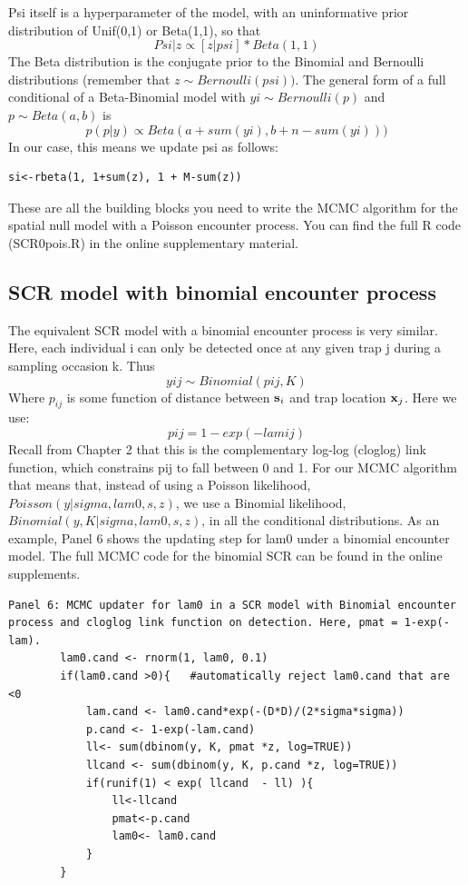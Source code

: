 Psi itself is a hyperparameter of the model, with an uninformative prior distribution of Unif(0,1) or Beta(1,1), so that
\[
Psi|z \propto [z|psi] * Beta(1,1)
\]
The Beta distribution is the conjugate prior to the Binomial and Bernoulli distributions (remember that $z \sim Bernoulli(psi))$. The general form of a full conditional of a Beta-Binomial model with $yi \sim Bernoulli (p) $ and $p \sim Beta(a,b) $ is 
\[
p(p|y) \propto Beta(a + sum(yi), b + n-sum(yi)))
\]
In our case, this means we update psi as follows:
\begin{verbatim}
si<-rbeta(1, 1+sum(z), 1 + M-sum(z)) 
\end{verbatim}

These are all the building blocks you need to write the MCMC algorithm
for the spatial null model with a Poisson encounter process.  You can
find the full R code (SCR0pois.R) in the online supplementary
material.

\subsection{SCR model with binomial encounter process}
The equivalent SCR model with a binomial encounter process is very similar. Here, each individual i can only be detected once at any given trap j during a sampling occasion k. 
Thus
\[
yij \sim Binomial (pij, K)
\]
Where $p_{ij}$ is some function of distance between ${\bf s}_{i}$ and trap location ${\bf x}_{j}$. Here we use:
\[
pij=1-exp(-lamij)
\]
Recall from Chapter 2 that this is the complementary log-log (cloglog) link function, which constrains pij to fall between 0 and 1.
For our MCMC algorithm that means that, instead of using a Poisson likelihood, $Poisson(y|sigma,lam0,s,z)$, we use a Binomial likelihood, $Binomial(y,K|sigma,lam0,s,z)$, in all the conditional distributions. As an example, Panel 6 shows the updating step for lam0 under a binomial encounter model. The full MCMC code for the binomial SCR can be found in the online supplements.
\begin{verbatim}
Panel 6: MCMC updater for lam0 in a SCR model with Binomial encounter process and cloglog link function on detection. Here, pmat = 1-exp(-lam). 
        lam0.cand <- rnorm(1, lam0, 0.1)
        if(lam0.cand >0){   #automatically reject lam0.cand that are <0
            lam.cand <- lam0.cand*exp(-(D*D)/(2*sigma*sigma))
            p.cand <- 1-exp(-lam.cand)
            ll<- sum(dbinom(y, K, pmat *z, log=TRUE))
            llcand <- sum(dbinom(y, K, p.cand *z, log=TRUE))
            if(runif(1) < exp( llcand  - ll) ){
                ll<-llcand
                pmat<-p.cand
                lam0<- lam0.cand
            }
        } 
\end{verbatim}

